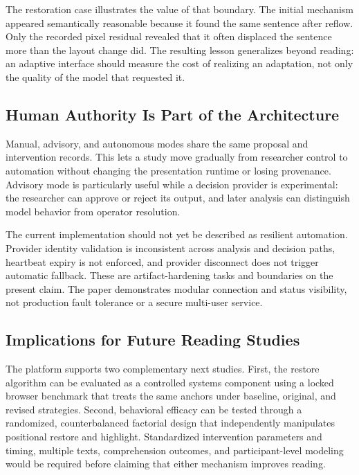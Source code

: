 \documentclass[sigconf,review,anonymous]{acmart}
\begin{document}
The restoration case illustrates the value of that boundary.
The initial mechanism appeared semantically reasonable because it found the same sentence after reflow.
Only the recorded pixel residual revealed that it often displaced the sentence more than the layout change did.
The resulting lesson generalizes beyond reading: an adaptive interface should measure the cost of realizing an adaptation, not only the quality of the model that requested it.

\subsection{Human Authority Is Part of the Architecture}

Manual, advisory, and autonomous modes share the same proposal and intervention records.
This lets a study move gradually from researcher control to automation without changing the presentation runtime or losing provenance.
Advisory mode is particularly useful while a decision provider is experimental: the researcher can approve or reject its output, and later analysis can distinguish model behavior from operator resolution.

The current implementation should not yet be described as resilient automation.
Provider identity validation is inconsistent across analysis and decision paths, heartbeat expiry is not enforced, and provider disconnect does not trigger automatic fallback.
These are artifact-hardening tasks and boundaries on the present claim.
The paper demonstrates modular connection and status visibility, not production fault tolerance or a secure multi-user service.

\subsection{Implications for Future Reading Studies}

The platform supports two complementary next studies.
First, the restore algorithm can be evaluated as a controlled systems component using a locked browser benchmark that treats the same anchors under baseline, original, and revised strategies.
Second, behavioral efficacy can be tested through a randomized, counterbalanced factorial design that independently manipulates positional restore and highlight.
Standardized intervention parameters and timing, multiple texts, comprehension outcomes, and participant-level modeling would be required before claiming that either mechanism improves reading.
\end{document}
